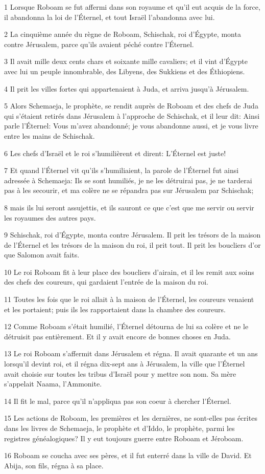 \par 1 Lorsque Roboam se fut affermi dans son royaume et qu'il eut acquis de la force, il abandonna la loi de l'Éternel, et tout Israël l'abandonna avec lui.
\par 2 La cinquième année du règne de Roboam, Schischak, roi d'Égypte, monta contre Jérusalem, parce qu'ils avaient péché contre l'Éternel.
\par 3 Il avait mille deux cents chars et soixante mille cavaliers; et il vint d'Égypte avec lui un peuple innombrable, des Libyens, des Sukkiens et des Éthiopiens.
\par 4 Il prit les villes fortes qui appartenaient à Juda, et arriva jusqu'à Jérusalem.
\par 5 Alors Schemaeja, le prophète, se rendit auprès de Roboam et des chefs de Juda qui s'étaient retirés dans Jérusalem à l'approche de Schischak, et il leur dit: Ainsi parle l'Éternel: Vous m'avez abandonné; je vous abandonne aussi, et je vous livre entre les mains de Schischak.
\par 6 Les chefs d'Israël et le roi s'humilièrent et dirent: L'Éternel est juste!
\par 7 Et quand l'Éternel vit qu'ils s'humiliaient, la parole de l'Éternel fut ainsi adressée à Schemaeja: Ils se sont humiliés, je ne les détruirai pas, je ne tarderai pas à les secourir, et ma colère ne se répandra pas sur Jérusalem par Schischak;
\par 8 mais ils lui seront assujettis, et ils sauront ce que c'est que me servir ou servir les royaumes des autres pays.
\par 9 Schischak, roi d'Égypte, monta contre Jérusalem. Il prit les trésors de la maison de l'Éternel et les trésors de la maison du roi, il prit tout. Il prit les boucliers d'or que Salomon avait faits.
\par 10 Le roi Roboam fit à leur place des boucliers d'airain, et il les remit aux soins des chefs des coureurs, qui gardaient l'entrée de la maison du roi.
\par 11 Toutes les fois que le roi allait à la maison de l'Éternel, les coureurs venaient et les portaient; puis ils les rapportaient dans la chambre des coureurs.
\par 12 Comme Roboam s'était humilié, l'Éternel détourna de lui sa colère et ne le détruisit pas entièrement. Et il y avait encore de bonnes choses en Juda.
\par 13 Le roi Roboam s'affermit dans Jérusalem et régna. Il avait quarante et un ans lorsqu'il devint roi, et il régna dix-sept ans à Jérusalem, la ville que l'Éternel avait choisie sur toutes les tribus d'Israël pour y mettre son nom. Sa mère s'appelait Naama, l'Ammonite.
\par 14 Il fit le mal, parce qu'il n'appliqua pas son coeur à chercher l'Éternel.
\par 15 Les actions de Roboam, les premières et les dernières, ne sont-elles pas écrites dans les livres de Schemaeja, le prophète et d'Iddo, le prophète, parmi les registres généalogiques? Il y eut toujours guerre entre Roboam et Jéroboam.
\par 16 Roboam se coucha avec ses pères, et il fut enterré dans la ville de David. Et Abija, son fils, régna à sa place.

